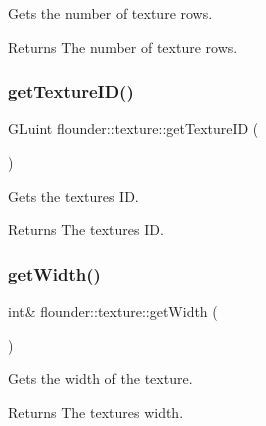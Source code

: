 Gets the number of texture rows. 

\begin{DoxyReturn}{Returns}
The number of texture rows. 
\end{DoxyReturn}
\mbox{\label{classflounder_1_1texture_a0259b718bf84710c21f1ebf823771ca4}} 
\subsubsection{\texorpdfstring{get\+Texture\+I\+D()}{getTextureID()}}
{\footnotesize\ttfamily G\+Luint flounder\+::texture\+::get\+Texture\+ID (\begin{DoxyParamCaption}{ }\end{DoxyParamCaption})\hspace{0.3cm}{\ttfamily [inline]}}



Gets the textures ID. 

\begin{DoxyReturn}{Returns}
The textures ID. 
\end{DoxyReturn}
\mbox{\label{classflounder_1_1texture_ad005b686f17fec6934fb57fab7f850a4}} 
\subsubsection{\texorpdfstring{get\+Width()}{getWidth()}}
{\footnotesize\ttfamily int\& flounder\+::texture\+::get\+Width (\begin{DoxyParamCaption}{ }\end{DoxyParamCaption})\hspace{0.3cm}{\ttfamily [inline]}}



Gets the width of the texture. 

\begin{DoxyReturn}{Returns}
The textures width. 
\end{DoxyReturn}
\mbox{\label{classflounder_1_1texture_a86178b4271979267f92200a0b7b2e405}} 
